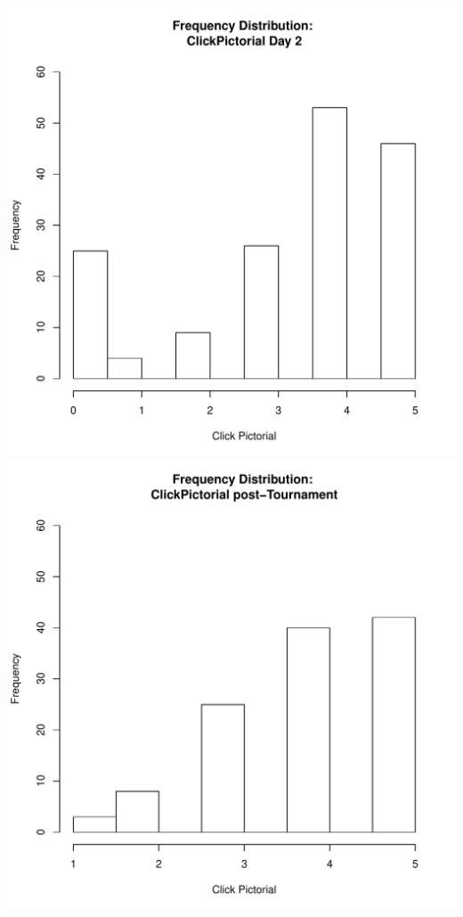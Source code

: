 \documentclass[12pt]{report}
\begin{document}
\includegraphics[scale =.4]{../images/distClickPictorialDay2.pdf}
\includegraphics[scale =.4]{../images/distClickPictorialPost.pdf}
\end{document}
